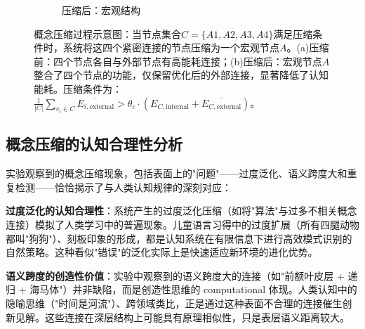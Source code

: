 \documentclass[12pt,a4paper]{article}
\begin{document}
\begin{figure}[H]
\begin{subfigure}[b]{0.45\textwidth}
\caption{压缩后：宏观结构}
\end{subfigure}
\vspace{0.5cm}  %

\caption{概念压缩过程示意图：当节点集合$C=\{A1,A2,A3,A4\}$满足压缩条件时，系统将这四个紧密连接的节点压缩为一个宏观节点$A$。(a)压缩前：四个节点各自与外部节点有高能耗连接；(b)压缩后：宏观节点$A$整合了四个节点的功能，仅保留优化后的外部连接，显著降低了认知能耗。压缩条件为：$\frac{1}{|C|}\sum_{v_i\in C}\overline{E_{i,\text{external}}} > \theta_c\cdot(E_{C,\text{internal}}+\overline{E_{C,\text{external}}})$。}
\label{fig:compression_process}
\end{figure}

\subsection{概念压缩的认知合理性分析}

实验观察到的概念压缩现象，包括表面上的"问题"——过度泛化、语义跨度大和重复检测——恰恰揭示了与人类认知规律的深刻对应：

\textbf{过度泛化的认知合理性}：系统产生的过度泛化压缩（如将"算法"与过多不相关概念连接）模拟了人类学习中的普遍现象。儿童语言习得中的过度扩展（所有四腿动物都叫"狗狗"）、刻板印象的形成，都是认知系统在有限信息下进行高效模式识别的自然策略。这种看似"错误"的泛化实际上是快速适应新环境的进化优势。

\textbf{语义跨度的创造性价值}：实验中观察到的语义跨度大的连接（如"前额叶皮层 + 递归 + 海马体"）并非缺陷，而是创造性思维的 computational 体现。人类认知中的隐喻思维（"时间是河流"）、跨领域类比，正是通过这种表面不合理的连接催生创新见解。这些连接在深层结构上可能具有原理相似性，只是表层语义距离较大。
\end{document}
